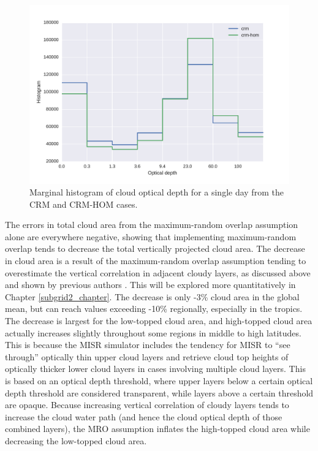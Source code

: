 \begin{figure}
\centering
\includegraphics[width=\columnwidth]{graphics/taudist_hom.pdf}
\caption{Marginal histogram of cloud optical depth for a single day from the CRM and CRM-HOM cases.}
\label{subgrid1_cldtau_distribution}
\end{figure}

The errors in total cloud area from the maximum-random overlap assumption alone are everywhere negative, showing that implementing maximum-random overlap tends to decrease the total vertically projected cloud area. The decrease in cloud area is a result of the maximum-random overlap assumption tending to overestimate the vertical correlation in adjacent cloudy layers, as discussed above and shown by previous authors \citep{mace_and_benson-troth_2002, hogan_and_illingworth_2000, barker_2008}. This will be explored more quantitatively in Chapter \ref{subgrid2_chapter}. The decrease is only -3\% cloud area in the global mean, but can reach values exceeding -10\% regionally, especially in the tropics. The decrease is largest for the low-topped cloud area, and high-topped cloud area actually increases slightly throughout some regions in middle to high latitudes. This is because the MISR simulator includes the tendency for MISR to ``see through'' optically thin upper cloud layers and retrieve cloud top heights of optically thicker lower cloud layers in cases involving multiple cloud layers. This is based on an optical depth threshold, where upper layers below a certain optical depth threshold are considered transparent, while layers above a certain threshold are opaque. Because increasing vertical correlation of cloudy layers tends to increase the cloud water path (and hence the cloud optical depth of those combined layers), the MRO assumption inflates the high-topped cloud area while decreasing the low-topped cloud area.


